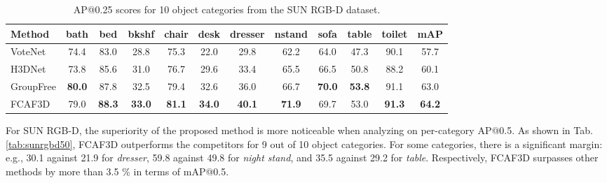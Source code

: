 \documentclass[runningheads]{llncs}
\begin{document}
\begin{table}[!h]
    \centering \small
    \begingroup \setlength{\tabcolsep}{2.5pt}
    \begin{tabular}{l|cccccccccc|c}
    \hline
    Method & bath & bed & bkshf & chair & desk & dresser & nstand & sofa & table & toilet & mAP \\ \hline
    VoteNet\cite{qi2019votenet} & 74.4 & 83.0 & 28.8 & 75.3 & 22.0 & 29.8 & 62.2 & 64.0 & 47.3 & 90.1 & 57.7 \\
    H3DNet\cite{zhang2020h3dnet} & 73.8 & 85.6 & 31.0 & 76.7 & 29.6 & 33.4 & 65.5 & 66.5 & 50.8 & 88.2 & 60.1 \\
    GroupFree\cite{liu2021group-free} & \textbf{80.0} & 87.8 & 32.5 & 79.4 & 32.6 & 36.0 & 66.7 & \textbf{70.0} & \textbf{53.8} & 91.1 & 63.0 \\
    FCAF3D & 79.0 & \textbf{88.3} & \textbf{33.0} & \textbf{81.1} & \textbf{34.0} & \textbf{40.1} & \textbf{71.9} & 69.7 & 53.0 & \textbf{91.3} & \textbf{64.2} \\ \hline
    \end{tabular} \endgroup
    \caption{AP@0.25 scores for 10 object categories from the SUN RGB-D dataset.}
    \label{tab:sunrgbd25}
\end{table}

For SUN RGB-D, the superiority of the proposed method is more noticeable when analyzing on per-category AP@0.5. As shown in Tab. \ref{tab:sunrgbd50}, FCAF3D outperforms the competitors for 9 out of 10 object categories. For some categories, there is a significant margin: e.g., 30.1 against 21.9 for \textit{dresser}, 59.8 against 49.8 for \textit{night stand}, and 35.5 against 29.2 for \textit{table}. Respectively, FCAF3D surpasses other methods by more than 3.5 \% in terms of mAP@0.5. 

\begin{table}[!h]
    \centering \small
    \begingroup \setlength{\tabcolsep}{2.5pt}
     \endgroup
    \caption{AP@0.5 scores for 10 object categories from the SUN RGB-D dataset.}
    \label{tab:sunrgbd50}
\end{table}
\end{document}
